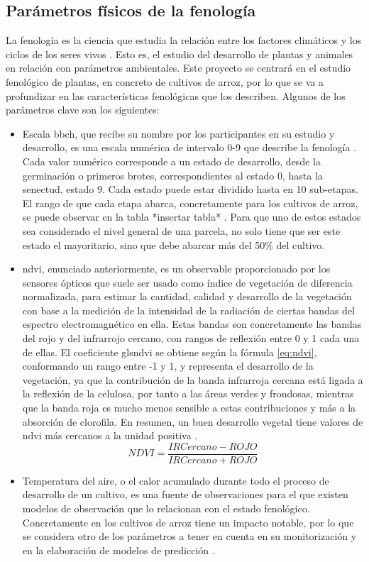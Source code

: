 \subsection{Parámetros físicos de la fenología}
\par La fenología es la ciencia que estudia la relación entre los factores climáticos y los ciclos de los seres vivos \citep{feno}. Esto es, el estudio del desarrollo de plantas y animales en relación con parámetros ambientales. Este proyecto se centrará en el estudio fenológico de plantas, en concreto de cultivos de arroz, por lo que se va a profundizar en las características fenológicas que los describen. Algunos de los parámetros clave son los siguientes: 
\begin{itemize}
	\item Escala \gls{bbch}, que recibe su nombre por los participantes en su estudio y desarrollo, es una escala numérica de intervalo 0-9 que describe la fenología \cite{bbch}. Cada valor numérico corresponde a un estado de desarrollo, desde la germinación o primeros brotes, correspondientes al estado 0, hasta la senectud, estado 9. Cada estado puede estar dividido hasta en 10 sub-etapas. El rango de que cada etapa abarca, concretamente para los cultivos de arroz, se puede observar en la tabla *insertar tabla* \cite{bbcht}. Para que uno de estos estados sea considerado el nivel general de una parcela, no solo tiene que ser este estado el mayoritario, sino que debe abarcar más del 50\% del cultivo. 
	\item \gls{ndvi}, enunciado anteriormente, es un observable proporcionado por los sensores ópticos que suele ser usado como índice de vegetación de diferencia normalizada, para estimar la cantidad, calidad y desarrollo de la vegetación con base a la medición de la intensidad de la radiación de ciertas bandas del espectro electromagnético en ella. Estas bandas son concretamente las bandas del rojo y del infrarrojo cercano, con rangos de  reflexión entre 0 y 1 cada una de ellas. El coeficiente gls{ndvi} se obtiene según la fórmula \ref{eq:ndvi}, conformando un rango entre -1 y 1, y representa el desarrollo de la vegetación, ya que la contribución de la banda infrarroja cercana está ligada a la reflexión de la celulosa, por tanto a las áreas verdes y frondosas, mientras que la banda roja es mucho menos sensible a estas contribuciones y más a la absorción de clorofila. En resumen, un buen desarrollo vegetal tiene valores de \gls{ndvi} más cercanos a la unidad positiva \citep{ndvi}. 
	\begin{equation} \label{eq:ndvi}
		NDVI = \frac{IRCercano-ROJO}{IRCercano+ROJO}
	\end{equation}
	\item Temperatura del aire, o el calor acumulado durante todo el proceso de desarrollo de un cultivo, es una fuente de observaciones para el que existen modelos de observación que lo relacionan con el estado fenológico. Concretamente en los cultivos de arroz tiene un impacto notable, por lo que se considera otro de los parámetros a tener en cuenta en su monitorización y en la elaboración de modelos de predicción \cite{Juanma2016}.
\end{itemize} 
